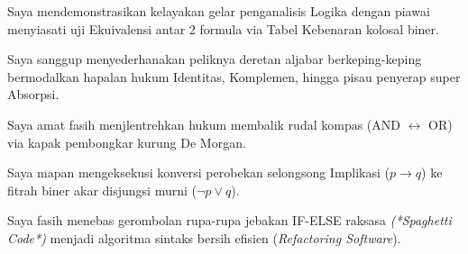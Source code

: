 \documentclass[../main]{subfiles}
\begin{document}

\begin{checklist}
  \item Saya mendemonstrasikan kelayakan gelar penganalisis Logika dengan piawai menyiasati uji Ekuivalensi antar 2 formula via Tabel Kebenaran kolosal biner.
  \item Saya sanggup menyederhanakan peliknya deretan aljabar berkeping-keping bermodalkan hapalan hukum Identitas, Komplemen, hingga pisau penyerap super Absorpsi.
  \item Saya amat fasih menjlentrehkan hukum membalik rudal kompas (AND $\leftrightarrow$ OR) via kapak pembongkar kurung De Morgan.
  \item Saya mapan mengeksekusi konversi perobekan selongsong Implikasi ($p \rightarrow q$) ke fitrah biner akar disjungsi murni ($\neg p \lor q$).
  \item Saya fasih menebas gerombolan rupa-rupa jebakan IF-ELSE raksasa \textit{(*Spaghetti Code*)} menjadi algoritma sintaks bersih efisien (\textit{Refactoring Software}).
\end{checklist}

\end{document}
